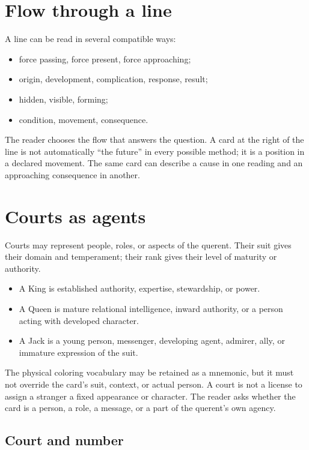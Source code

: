 \section{Flow through a line}

A line can be read in several compatible ways:

\begin{itemize}
\item force passing, force present, force approaching;
\item origin, development, complication, response, result;
\item hidden, visible, forming;
\item condition, movement, consequence.
\end{itemize}

The reader chooses the flow that answers the question. A card at the right of
the line is not automatically ``the future'' in every possible method; it is a
position in a declared movement. The same card can describe a cause in one
reading and an approaching consequence in another.

\section{Courts as agents}

Courts may represent people, roles, or aspects of the querent. Their suit gives
their domain and temperament; their rank gives their level of maturity or
authority.

\begin{itemize}
\item A King is established authority, expertise, stewardship, or power.
\item A Queen is mature relational intelligence, inward authority, or a person
      acting with developed character.
\item A Jack is a young person, messenger, developing agent, admirer, ally, or
      immature expression of the suit.
\end{itemize}

The physical coloring vocabulary may be retained as a mnemonic, but it must not
override the card's suit, context, or actual person. A court is not a license to
assign a stranger a fixed appearance or character. The reader asks whether the
card is a person, a role, a message, or a part of the querent's own agency.

\subsection{Court and number}

